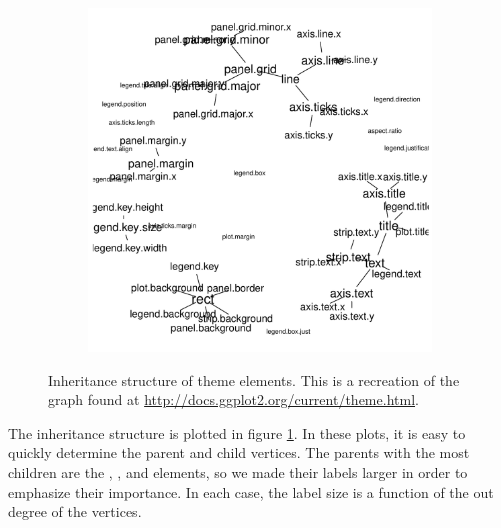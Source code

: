 \begin{figure}[hbtp]
\begin{subfigure}[t]{\textwidth}
\begin{adjustbox}{valign=t}
\begin{minipage}{.49\textwidth}
                   \end{minipage}

                  \begin{minipage}{.49\textwidth}

\includegraphics[width=\textwidth]{figure/theme_ggnetwork-1.pdf}

                          \end{minipage}

                          \end{adjustbox}
\end{subfigure}

\caption{\label{fig.cap:theme} Inheritance structure of  theme elements. This is a recreation of the graph found at \protect\url{http://docs.ggplot2.org/current/theme.html}.}
\end{figure}
\afterpage{\clearpage}

The inheritance structure is plotted in figure \ref{fig.cap:theme}.  In these plots, it is easy to quickly determine the parent and child vertices. The parents with the most children are the , , and  elements, so we made their labels larger in order to emphasize their importance. In each case, the label size is a function of the out degree of the vertices.

